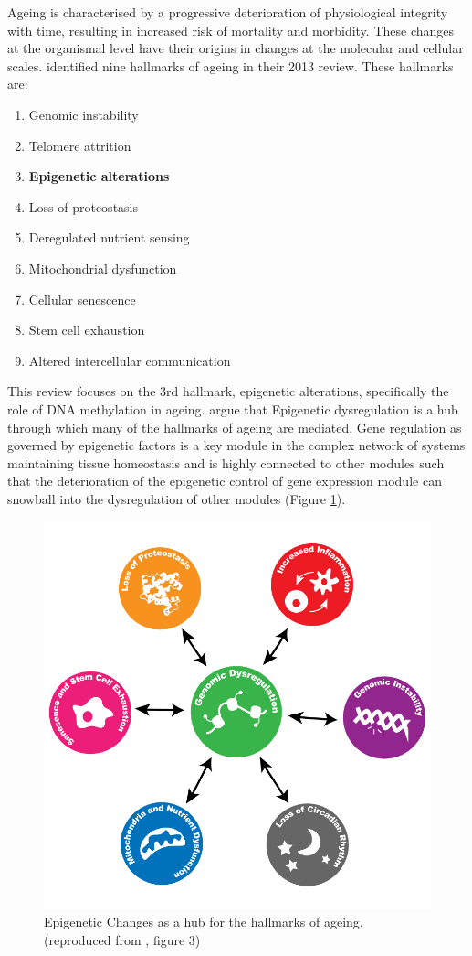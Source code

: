 \documentclass[]{book}
\providecommand{\tightlist}{%
  \setlength{\itemsep}{0pt}\setlength{\parskip}{0pt}}
\begin{document}
Ageing is characterised by a progressive deterioration of physiological integrity with time, resulting in increased risk of mortality and morbidity. These changes at the organismal level have their origins in changes at the molecular and cellular scales. \citet{Lopez-Otin2013} identified nine hallmarks of ageing in their 2013 review. These hallmarks are:

\begin{enumerate}
\def\labelenumi{\arabic{enumi}.}
\tightlist
\item
  Genomic instability
\item
  Telomere attrition
\item
  \textbf{Epigenetic alterations}
\item
  Loss of proteostasis
\item
  Deregulated nutrient sensing
\item
  Mitochondrial dysfunction
\item
  Cellular senescence
\item
  Stem cell exhaustion
\item
  Altered intercellular communication
\end{enumerate}

This review focuses on the 3rd hallmark, epigenetic alterations, specifically the role of DNA methylation in ageing. \citet{Booth2016} argue that Epigenetic dysregulation is a hub through which many of the hallmarks of ageing are mediated. Gene regulation as governed by epigenetic factors is a key module in the complex network of systems maintaining tissue homeostasis and is highly connected to other modules such that the deterioration of the epigenetic control of gene expression module can snowball into the dysregulation of other modules (Figure \ref{fig:Booth2016fig3}).

\begin{figure}

{\centering \includegraphics[width=0.6\linewidth]{figs/Booth2016_F3_epigenomeHubAgingHallmarks_alpha} 

}

\caption{Epigenetic Changes as a hub for the hallmarks of ageing.
(reproduced from \citep{Booth2016}, figure 3)}\label{fig:Booth2016fig3}
\end{figure}
\end{document}
